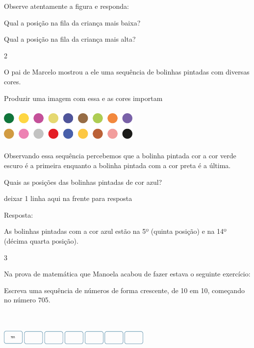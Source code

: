 \begin{escolha}
Observe atentamente a figura e responda:

\begin{escolha}

  \item Qual a posição na fila da criança mais baixa?


  \item Qual a posição na fila da criança mais alta?


\end{escolha}

\num{2}

O pai de Marcelo mostrou a ele uma sequência de bolinhas pintadas com
diversas cores.

Produzir uma imagem com essa e as cores importam

\includegraphics[width=2.72524in,height=0.68339in]{media/image28.png}

Observando essa sequência percebemos que a bolinha pintada cor a cor
verde escuro é a primeira enquanto a bolinha pintada com a cor preta é a
última.

Quais as posições das bolinhas pintadas de cor azul?

deixar 1 linha aqui na frente para resposta

Resposta:

As bolinhas pintadas com a cor azul estão na 5º (quinta posição) e na
14º (décima quarta posição).

\num{3}

Na prova de matemática que Manoela acabou de fazer estava o seguinte
exercício:

Escreva uma sequência de números de forma crescente, de 10 em 10,
começando no número 705.

\includegraphics[width=2.95859in,height=1.10010in]{media/image29.png}


\end{escolha}
